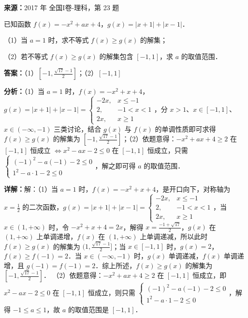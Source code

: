 \begin{question}[points=10]
\textbf{来源：}2017 年 全国I卷-理科，第 23 题\par
[选修 4-5：不等式选讲]

已知函数 $f(x)=-x^2+ax+4$，$g(x)=|x+1|+|x-1|$．

（1）当 $a=1$ 时，求不等式 $f(x)\geq g(x)$ 的解集；

（2）若不等式 $f(x)\geq g(x)$ 的解集包含 $[-1,1]$，求 $a$ 的取值范围．
\begin{solution}
\textbf{答案：}（1）$[-1,\frac{\sqrt{17}-1}{2}]$；（2）$[-1,1]$

\textbf{分析：}（1）当 $a=1$ 时，$f(x)=-x^2+x+4$，$g(x)=|x+1|+|x-1|=\begin{cases} -2x, & x\leq-1 \\ 2, & -1<x<1 \\ 2x, & x\geq1 \end{cases}$，分 $x>1$、$x\in[-1,1]$、$x\in(-\infty,-1)$ 三类讨论，结合 $g(x)$ 与 $f(x)$ 的单调性质即可求得 $f(x)\geq g(x)$ 的解集为 $[-1,\frac{\sqrt{17}-1}{2}]$；（2）依题意得：$-x^2+ax+4\geq2$ 在 $[-1,1]$ 恒成立 $\Leftrightarrow x^2-ax-2\leq0$ 在 $[-1,1]$ 恒成立，只需 $\begin{cases} (-1)^2-a(-1)-2\leq0 \\ 1^2-a\cdot1-2\leq0 \end{cases}$，解之即可得 $a$ 的取值范围．

\textbf{详解：}解：（1）当 $a=1$ 时，$f(x)=-x^2+x+4$，是开口向下，对称轴为 $x=\frac{1}{2}$ 的二次函数，$g(x)=|x+1|+|x-1|=\begin{cases} -2x, & x\leq-1 \\ 2, & -1<x<1 \\ 2x, & x\geq1 \end{cases}$，当 $x\in(1,+\infty)$ 时，令 $-x^2+x+4=2x$，解得 $x=\frac{-1+\sqrt{17}}{2}$，$g(x)$ 在 $(1,+\infty)$ 上单调递增，$f(x)$ 在 $(1,+\infty)$ 上单调递减，所以此时 $f(x)\geq g(x)$ 的解集为 $(1,\frac{\sqrt{17}-1}{2}]$；当 $x\in[-1,1]$ 时，$g(x)=2$，$f(x)\geq f(-1)=2$．当 $x\in(-\infty,-1)$ 时，$g(x)$ 单调递减，$f(x)$ 单调递增，且 $g(-1)=f(-1)=2$．综上所述，$f(x)\geq g(x)$ 的解集为 $[-1,\frac{\sqrt{17}-1}{2}]$．
（2）依题意得：$-x^2+ax+4\geq2$ 在 $[-1,1]$ 恒成立，即 $x^2-ax-2\leq0$ 在 $[-1,1]$ 恒成立，则只需 $\begin{cases} (-1)^2-a(-1)-2\leq0 \\ 1^2-a\cdot1-2\leq0 \end{cases}$，解得 $-1\leq a\leq1$，故 $a$ 的取值范围是 $[-1,1]$．
\end{solution}
\end{question}

